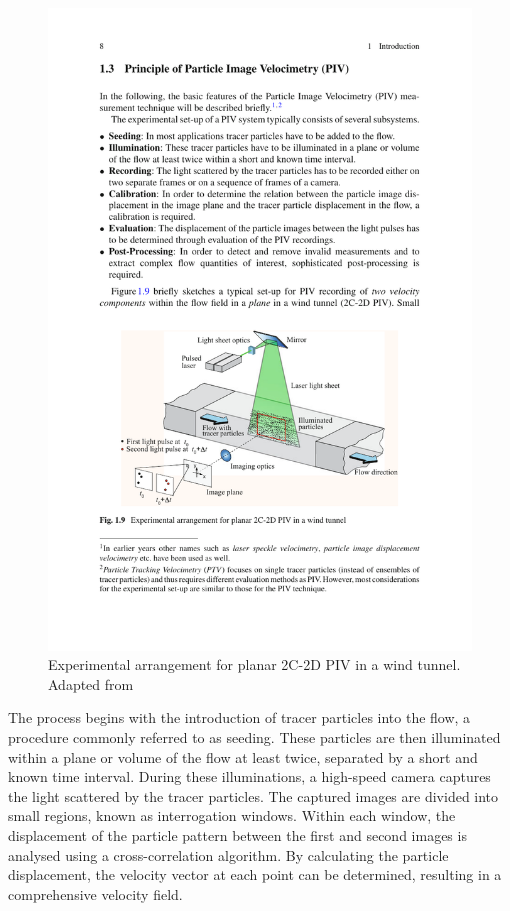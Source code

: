 \begin{figure}[H]
    \centering
    \includegraphics[width=1\linewidth, trim=0 0 0 5, clip]{Figures/piv_diagram.pdf}
    \caption{Experimental arrangement for planar 2C-2D PIV in a wind tunnel. Adapted from \cite{Raffel2018ParticleEdition}}
    \label{fig:piv_diagram}
\end{figure}

The process begins with the introduction of tracer particles into the flow, a procedure commonly referred to as seeding. These particles are then illuminated within a plane or volume of the flow at least twice, separated by a short and known time interval. During these illuminations, a high-speed camera captures the light scattered by the tracer particles. The captured images are divided into small regions, known as interrogation windows. Within each window, the displacement of the particle pattern between the first and second images is analysed using a cross-correlation algorithm. By calculating the particle displacement, the velocity vector at each point can be determined, resulting in a comprehensive velocity field. \cite{Raffel2018ParticleEdition}\vspace{0.5em}

